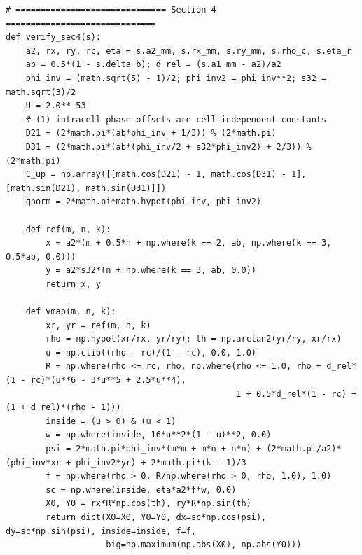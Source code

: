 \documentclass[11pt,a4paper]{article}
\theoremstyle{definition}
\theoremstyle{remark}
\begin{document}
\begin{lstlisting}
# ============================== Section 4 ==============================
def verify_sec4(s):
    a2, rx, ry, rc, eta = s.a2_mm, s.rx_mm, s.ry_mm, s.rho_c, s.eta_r
    ab = 0.5*(1 - s.delta_b); d_rel = (s.a1_mm - a2)/a2
    phi_inv = (math.sqrt(5) - 1)/2; phi_inv2 = phi_inv**2; s32 = math.sqrt(3)/2
    U = 2.0**-53
    # (1) intracell phase offsets are cell-independent constants
    D21 = (2*math.pi*(ab*phi_inv + 1/3)) % (2*math.pi)
    D31 = (2*math.pi*(ab*(phi_inv/2 + s32*phi_inv2) + 2/3)) % (2*math.pi)
    C_up = np.array([[math.cos(D21) - 1, math.cos(D31) - 1], [math.sin(D21), math.sin(D31)]])
    qnorm = 2*math.pi*math.hypot(phi_inv, phi_inv2)

    def ref(m, n, k):
        x = a2*(m + 0.5*n + np.where(k == 2, ab, np.where(k == 3, 0.5*ab, 0.0)))
        y = a2*s32*(n + np.where(k == 3, ab, 0.0))
        return x, y

    def vmap(m, n, k):
        xr, yr = ref(m, n, k)
        rho = np.hypot(xr/rx, yr/ry); th = np.arctan2(yr/ry, xr/rx)
        u = np.clip((rho - rc)/(1 - rc), 0.0, 1.0)
        R = np.where(rho <= rc, rho, np.where(rho <= 1.0, rho + d_rel*(1 - rc)*(u**6 - 3*u**5 + 2.5*u**4),
                                              1 + 0.5*d_rel*(1 - rc) + (1 + d_rel)*(rho - 1)))
        inside = (u > 0) & (u < 1)
        w = np.where(inside, 16*u**2*(1 - u)**2, 0.0)
        psi = 2*math.pi*phi_inv*(m*m + m*n + n*n) + (2*math.pi/a2)*(phi_inv*xr + phi_inv2*yr) + 2*math.pi*(k - 1)/3
        f = np.where(rho > 0, R/np.where(rho > 0, rho, 1.0), 1.0)
        sc = np.where(inside, eta*a2*f*w, 0.0)
        X0, Y0 = rx*R*np.cos(th), ry*R*np.sin(th)
        return dict(X0=X0, Y0=Y0, dx=sc*np.cos(psi), dy=sc*np.sin(psi), inside=inside, f=f,
                    big=np.maximum(np.abs(X0), np.abs(Y0)))


\end{lstlisting}
\end{document}
